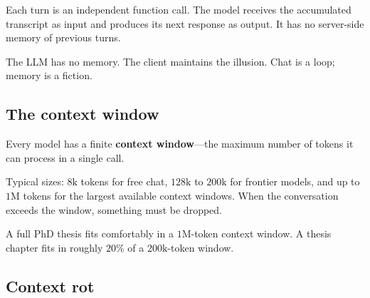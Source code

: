 Each turn is an independent function call.  The model receives the
accumulated transcript as input and produces its next response as
output.  It has no server-side memory of previous turns.

\begin{keyresult}
  The LLM has no memory.  The client maintains the illusion.  Chat is a
  loop; memory is a fiction.
\end{keyresult}

\subsection{The context window}

Every model has a finite \textbf{context window}---the maximum number of
tokens it can process in a single call.

\begin{center}
\end{center}

Typical sizes: $8\text{k}$ tokens for free chat, $128\text{k}$ to
$200\text{k}$ for frontier models, and up to $1\text{M}$ tokens for the
largest available context windows.  When the conversation exceeds the
window, something must be dropped.

\begin{remark}
  A full PhD thesis fits comfortably in a $1\text{M}$-token context
  window.  A thesis chapter fits in roughly $20\%$ of a
  $200\text{k}$-token window.
\end{remark}

\subsection{Context rot}

